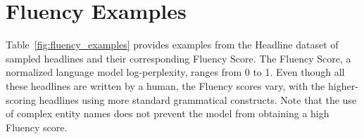 \documentclass[11pt,a4paper]{article}
\begin{document}
\section{Fluency Examples}
Table~\ref{fig:fluency_examples} provides examples from the Headline dataset of sampled headlines and their corresponding Fluency Score. The Fluency Score, a normalized language model log-perplexity, ranges from 0 to 1. Even though all these headlines are written by a human, the Fluency scores vary, with the higher-scoring headlines using more standard grammatical constructs. Note that the use of complex entity names does not prevent the model from obtaining a high Fluency score.

\begin{table}[!htbp]
    \caption{\textbf{Example selected headlines and their Fluency score.} The headlines were picked from a corpus of human-written news headlines. The average Fluency in the corpus is 0.479.}
    \label{fig:fluency_examples}
\end{table}
\end{document}
